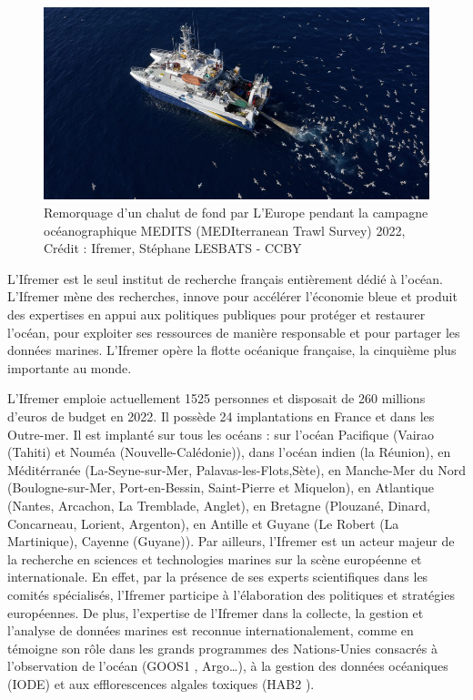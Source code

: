 \documentclass[
]{article}
\begin{document}
\begin{figure}
\centering
\includegraphics{ChalutIfremer.png}
\caption{Remorquage d'un chalut de fond par L'Europe pendant la campagne
océanographique MEDITS (MEDIterranean Trawl Survey) 2022, Crédit :
Ifremer, Stéphane LESBATS - CCBY}
\end{figure}

L'Ifremer est le seul institut de recherche français entièrement dédié à
l'océan. L'Ifremer mène des recherches, innove pour accélérer l'économie
bleue et produit des expertises en appui aux politiques publiques pour
protéger et restaurer l'océan, pour exploiter ses ressources de manière
responsable et pour partager les données marines. L'Ifremer opère la
flotte océanique française, la cinquième plus importante au monde.

L'Ifremer emploie actuellement 1525 personnes et disposait de 260
millions d'euros de budget en 2022. Il possède 24 implantations en
France et dans les Outre-mer. Il est implanté sur tous les océans : sur
l'océan Pacifique (Vairao (Tahiti) et Nouméa (Nouvelle-Calédonie)), dans
l'océan indien (la Réunion), en Méditérranée (La-Seyne-sur-Mer,
Palavas-les-Flots,Sète), en Manche-Mer du Nord (Boulogne-sur-Mer,
Port-en-Bessin, Saint-Pierre et Miquelon), en Atlantique (Nantes,
Arcachon, La Tremblade, Anglet), en Bretagne (Plouzané, Dinard,
Concarneau, Lorient, Argenton), en Antille et Guyane (Le Robert (La
Martinique), Cayenne (Guyane)). Par ailleurs, l'Ifremer est un acteur
majeur de la recherche en sciences et technologies marines sur la scène
européenne et internationale. En effet, par la présence de ses experts
scientifiques dans les comités spécialisés, l'Ifremer participe à
l'élaboration des politiques et stratégies européennes. De plus,
l'expertise de l'Ifremer dans la collecte, la gestion et l'analyse de
données marines est reconnue internationalement, comme en témoigne son
rôle dans les grands programmes des Nations-Unies consacrés à
l'observation de l'océan (GOOS1 , Argo\ldots), à la gestion des données
océaniques (IODE) et aux efflorescences algales toxiques (HAB2 ).
\end{document}
